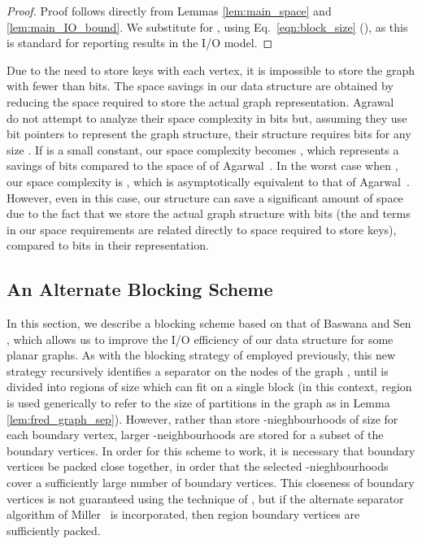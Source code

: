\begin{proof}
  Proof follows directly from Lemmas \ref{lem:main_space} and
  \ref{lem:main_IO_bound}. We substitute  for , using
  Eq.~\ref{eqn:block_size} (), as this is standard for
  reporting results in the I/O model.
\end{proof}

Due to the need to store keys with each vertex, it is impossible to
store the graph with fewer than  bits.  The space savings in our
data structure are obtained by reducing the space required to store
the actual graph representation.
Agrawal~\etal~\cite{DBLP:conf/soda/AgarwalAMVV98} do not attempt to
analyze their space complexity in bits but, assuming they use
 bit pointers to represent the graph structure, their
structure requires  bits for any size . If  is
a small constant, our space complexity becomes , which represents a savings of  bits compared to
the  space of of Agarwal~\etal. In the worst case
when , our space complexity is 
, which is asymptotically equivalent to that of
Agarwal~\etal. However, even in this case, our structure can save a
significant amount of space due to the fact that we store the actual
graph structure with  bits (the  and 
terms in our space requirements are related directly to space required
to store keys), compared to  bits in their
representation.

\subsection{An Alternate Blocking Scheme}\label{sec:alt_block_scheme}


In this section, we describe a blocking scheme based on that
of Baswana and Sen \cite{DBLP:journals/algorithmica/BaswanaS02}, which
allows us to improve the I/O efficiency of our data structure for some
planar graphs. 
As with the blocking strategy of
\cite{DBLP:conf/soda/AgarwalAMVV98} employed previously, this new
strategy recursively identifies a separator on the nodes of the graph
, until  is divided into regions of size  which can fit on a
single block (in this context, region is used generically to refer to
the size of partitions in the graph as in Lemma
\ref{lem:fred_graph_sep}). However, rather than store
-nieghbourhoods of size  for each boundary vertex,
larger -neighbourhoods are stored for a subset of the boundary
vertices. In order for this scheme to work, it is necessary that
boundary vertices be packed close together, in order that the selected
-nieghbourhoods cover a sufficiently large number of boundary
vertices. This closeness of boundary vertices is not guaranteed using
the technique of \cite{DBLP:conf/soda/AgarwalAMVV98}, but if the
alternate separator algorithm of Miller~\cite{miller_1986} is
incorporated, then region boundary vertices are sufficiently packed.

